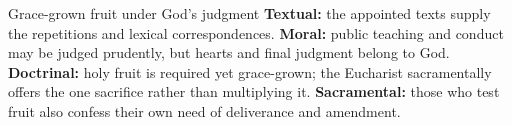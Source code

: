 \begin{studybox}{Grace-grown fruit under God's judgment}
\textbf{Textual:} the appointed texts supply the repetitions and lexical correspondences. \textbf{Moral:} public teaching and conduct may be judged prudently, but hearts and final judgment belong to God. \textbf{Doctrinal:} holy fruit is required yet grace-grown; the Eucharist sacramentally offers the one sacrifice rather than multiplying it. \textbf{Sacramental:} those who test fruit also confess their own need of deliverance and amendment.
\end{studybox}
